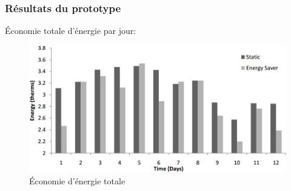 \begin{frame}
 \frametitle{Résultats du prototype}
 Économie totale d'énergie par jour:
 \begin{figure}
  \centering
  \includegraphics[scale=0.38]{figures/energysaver.jpg}
  \caption{Économie d'énergie totale}
 \end{figure} 
\end{frame}